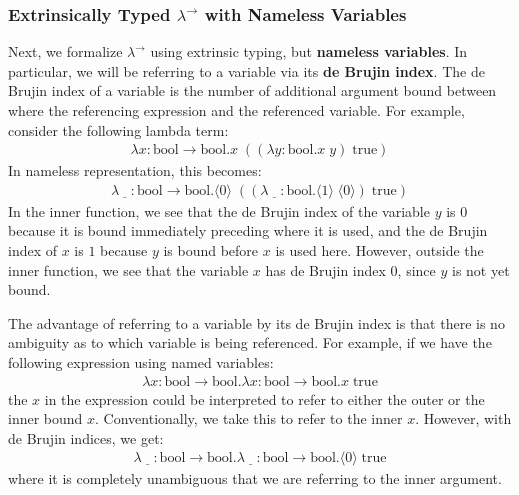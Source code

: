 \documentclass[12pt, letterpaper]{article}
\begin{document}
\subsubsection{Extrinsically Typed $\lambda^{\to}$ with Nameless Variables}
Next, we formalize $\lambda^{\to}$ using extrinsic typing, but \textbf{nameless variables}. In particular, we will be referring to a variable via its \textbf{de Brujin index}. The de Brujin index of a variable is the number of additional argument bound between where the referencing expression and the referenced variable. For example, consider the following lambda term:
\begin{align*}
\lambda x : \text{bool} \to \text{bool} . x\;((\lambda y : \text{bool} . x\;y)\;\text{true})
\end{align*}
In nameless representation, this becomes:
\begin{align*}
\lambda \underline{\;\;\;} : \text{bool} \to \text{bool} . \langle 0 \rangle\;((\lambda \underline{\;\;\;} : \text{bool} . \langle 1 \rangle\;\langle 0 \rangle)\;\text{true})
\end{align*}
In the inner function, we see that the de Brujin index of the variable $y$ is $0$ because it is bound immediately preceding where it is used, and the de Brujin index of $x$ is $1$ because $y$ is bound before $x$ is used here. However, outside the inner function, we see that the variable $x$ has de Brujin index $0$, since $y$ is not yet bound.

The advantage of referring to a variable by its de Brujin index is that there is no ambiguity as to which variable is being referenced. For example, if we have the following expression using named variables:
\begin{align*}
\lambda x : \text{bool} \to \text{bool} . \lambda x : \text{bool} \to \text{bool} . x\;\text{true}
\end{align*}
the $x$ in the expression could be interpreted to refer to either the outer or the inner bound $x$. Conventionally, we take this to refer to the inner $x$. However, with de Brujin indices, we get:
\begin{align*}
\lambda \underline{\;\;\;} : \text{bool} \to \text{bool} . \lambda \underline{\;\;\;} : \text{bool} \to \text{bool} . \langle 0 \rangle\;\text{true}
\end{align*}
where it is completely unambiguous that we are referring to the inner argument.
\end{document}
